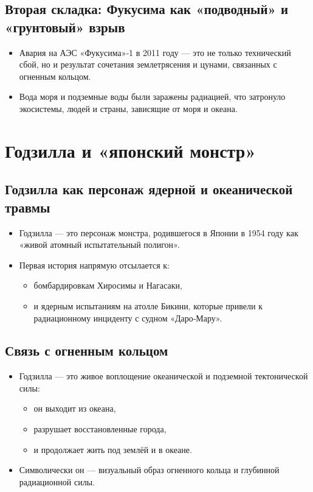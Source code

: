 \documentclass[12pt]{article}
\begin{document}
\subsection{Вторая складка: Фукусима как «подводный» и «грунтовый» взрыв}

\begin{itemize}
  \item Авария на АЭС «Фукусима»‑1 в 2011 году — это не только технический сбой, но и результат сочетания землетрясения и цунами, связанных с огненным кольцом.
  \item Вода моря и подземные воды были заражены радиацией, что затронуло экосистемы, людей и страны, зависящие от моря и океана.
\end{itemize}

\section{Годзилла и «японский монстр»}

\subsection{Годзилла как персонаж ядерной и океанической травмы}

\begin{itemize}
  \item Годзилла — это персонаж монстра, родившегося в Японии в 1954 году как «живой атомный испытательный полигон».
  \item Первая история напрямую отсылается к:
    \begin{itemize}
      \item бомбардировкам Хиросимы и Нагасаки,
      \item и ядерным испытаниям на атолле Бикини, которые привели к радиационному инциденту с судном «Даро‑Мару».
    \end{itemize}
\end{itemize}

\subsection{Связь с огненным кольцом}

\begin{itemize}
  \item Годзилла — это живое воплощение океанической и подземной тектонической силы:
    \begin{itemize}
      \item он выходит из океана,
      \item разрушает восстановленные города,
      \item и продолжает жить под землёй и в океане.
    \end{itemize}
  \item Символически он — визуальный образ огненного кольца и глубинной радиационной силы.
\end{itemize}
\end{document}

